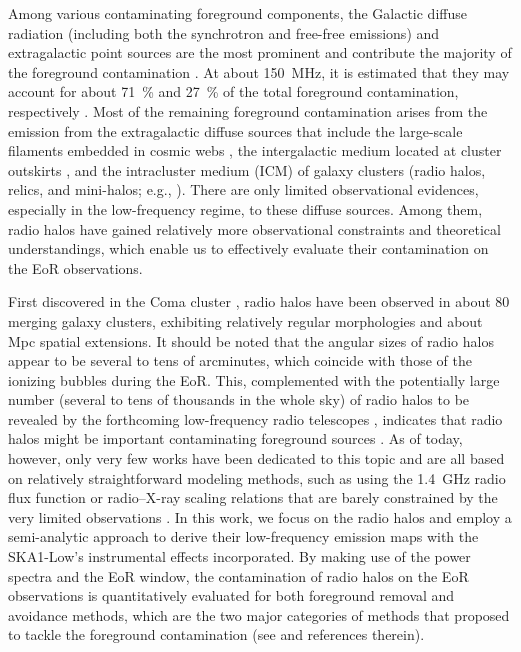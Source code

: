 \documentclass[twocolumn]{aastex62}
\newcommand{\editone}[1]{{\leavevmode\color{cyan}#1}}
\begin{document}
Among various contaminating foreground components, the Galactic diffuse
radiation (including both the synchrotron and free-free emissions)
and extragalactic point sources are the most prominent and contribute
the majority of the foreground contamination \citep[e.g.,][]{%
  shaver1999,diMatteo2004,gleser2008,liu2012,murray2017,spinelli2018}.
At about \SI{150}{\MHz}, it is estimated that they may account for
about \SI{71}{\percent} and \SI{27}{\percent} of the total foreground
contamination, respectively \citep{shaver1999}.
Most of the remaining foreground contamination arises from the emission
from the extragalactic diffuse sources that include the large-scale
filaments embedded in cosmic webs \citep[e.g.,][]{vazza2015},
the intergalactic medium located at cluster outskirts
\citep[e.g.,][]{keshet2004rev},
and the intracluster medium (ICM) of galaxy clusters (radio halos,
relics, and mini-halos; e.g., \citealt{feretti2012rev}).
There are only limited observational evidences, especially in the
low-frequency regime, to these diffuse sources.
Among them, radio halos have gained relatively more observational
constraints and theoretical understandings, which enable us to
effectively evaluate their contamination on the EoR observations.

First discovered in the Coma cluster \citep{large1959}, radio halos
have been observed in about 80 merging galaxy clusters, exhibiting
relatively regular morphologies and about \si{Mpc} spatial extensions.
It should be noted that the angular sizes of radio halos appear to be
several to tens of arcminutes, which coincide with those of the
ionizing bubbles during the EoR.
This, complemented with the potentially large number (several to tens of
thousands in the whole sky) of radio halos to be revealed by the
forthcoming low-frequency radio telescopes \citep[e.g.,][]{cassano2015},
indicates that radio halos might be important contaminating foreground
sources \citep[e.g.,][]{diMatteo2004,gleser2008}.
As of today, however, only very few works have been dedicated to this
topic and are all based on relatively straightforward modeling methods,
such as using the \SI{1.4}{\GHz} radio flux function or radio--X-ray
scaling relations that are barely constrained by the very limited
observations \citep[e.g.,][]{gleser2008,jelic2008}.
In this work, we focus on the radio halos and employ a
\editone{semi-analytic approach}
to derive their low-frequency emission maps with the SKA1-Low's
instrumental effects incorporated.
By making use of the power spectra and the EoR window, the contamination
of radio halos on the EoR observations is quantitatively evaluated for
both foreground removal and avoidance methods, which are the two major
categories of methods that proposed to tackle the foreground
contamination (see \citealt{chapman2016} and references therein).
\end{document}
